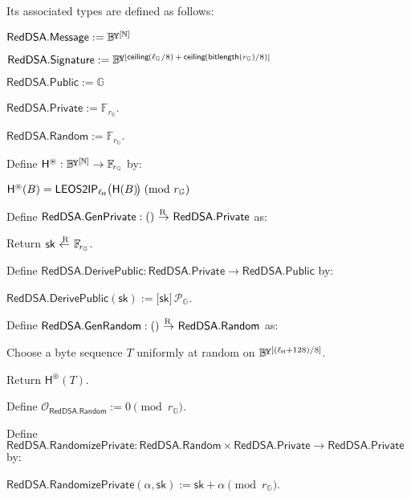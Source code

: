 \documentclass{article}
\newcommand{\typecolon}{:}
\newcommand{\overlap}[2]{\rlap{#2}\hspace{#1}{#2}}
\newcommand{\byte}{\mathbb{B}\kern -0.1em\raisebox{0.48ex}{\overlap{0.0001em}{\scalebox{0.7}{$\mathbb{Y}$}}}}
\newcommand{\Nat}{\mathbb{N}}
\newcommand{\Field}[1]{\mathbb{F}_{\!#1}}
\newcommand{\typeexp}[2]{{#1}\vphantom{)}^{[{#2}]}}
\newcommand{\byteseq}[1]{\typeexp{\byte}{#1}}
\newcommand{\byteseqs}{\byteseq{\Nat}}
\newcommand{\bitlength}{\mathsf{bitlength}}
\newcommand{\ceiling}[1]{\mathsf{ceiling}\kern-0.06em\left({#1}\right)}
\newcommand{\scalarmult}[2]{\boldsymbol{[}{#1}\boldsymbol{]}\,{#2}}
\newcommand{\clasp}[3][0pt]{\stackengine{0pt}{#3}{\kern#1#2}{O}{c}{F}{F}{L}}
\newcommand{\rightarrowR}{\mathop{\clasp[-0.18em]{\raisebox{1.15ex}{\scriptsize R}}{$\,\rightarrow\,$}}}
\newcommand{\leftarrowR}{\mathop{\clasp[0.15em]{\raisebox{1.15ex}{\scriptsize R}}{$\,\leftarrow\,$}}}
\newcommand{\sk}{\mathsf{sk}}
\newcommand{\RedDSA}{\mathsf{RedDSA}}
\newcommand{\RedDSAPublic}{\RedDSA\mathsf{.Public}}
\newcommand{\RedDSAPrivate}{\RedDSA\mathsf{.Private}}
\newcommand{\RedDSAMessage}{\RedDSA\mathsf{.Message}}
\newcommand{\RedDSASignature}{\RedDSA\mathsf{.Signature}}
\newcommand{\RedDSAGenPrivate}{\RedDSA\mathsf{.GenPrivate}}
\newcommand{\RedDSADerivePublic}{\RedDSA\mathsf{.DerivePublic}}
\newcommand{\RedDSARandom}{\RedDSA\mathsf{.Random}}
\newcommand{\RedDSAGenRandom}{\RedDSA\mathsf{.GenRandom}}
\newcommand{\RedDSARandomizePrivate}{\RedDSA\mathsf{.RandomizePrivate}}
\newcommand{\RedDSARandomizerId}{\Zero_{\RedDSARandom}}
\newcommand{\RedDSARandomizer}{\alpha}
\newcommand{\RedDSAHash}{\mathsf{H}}
\newcommand{\RedDSAHashToScalar}{\RedDSAHash^{\circledast}}
\newcommand{\RedDSAHashLength}{\ell_{\RedDSAHash}}
\newcommand{\Zero}{\mathcal{O}}
\newcommand{\Generator}{\mathcal{P}}
\newcommand{\ParamG}[1]{{{#1}_\mathbb{G}}}
\newcommand{\GroupG}[1]{\mathbb{G}_{#1}}
\newcommand{\GenG}[1]{\Generator_{\GroupG{#1}}}
\newcommand{\ellG}[1]{\ell_{\GroupG{#1}}}
\newcommand{\LEOStoIP}[1]{\mathsf{LEOS2IP}_{#1}}
\begin{document}
Its associated types are defined as follows:
\begin{formulae}
  \item $\RedDSAMessage := \byteseqs$
  \item $\RedDSASignature := \smash{\byteseq{\ceiling{\smash{\ellG{}}/8}\, +\, \ceiling{\bitlength(\ParamG{r})/8}}}$
  \item $\RedDSAPublic := \GroupG{}$
  \item $\RedDSAPrivate := \Field{\ParamG{r}}$.
  \item $\RedDSARandom := \Field{\ParamG{r}}$.
\end{formulae}

Define $\RedDSAHashToScalar \typecolon \byteseqs \rightarrow \Field{\ParamG{r}}$ by:
\begin{formulae}
  \item $\RedDSAHashToScalar(B) = \LEOStoIP{\RedDSAHashLength}\big(\RedDSAHash(B)\kern-0.16em\big) \!\pmod{\ParamG{r}}$
\end{formulae}

Define $\RedDSAGenPrivate \typecolon () \rightarrowR \RedDSAPrivate$ as:
\begin{formulae}
  \item Return $\sk \leftarrowR \Field{\ParamG{r}}$.
\end{formulae}

Define $\RedDSADerivePublic \typecolon \RedDSAPrivate \rightarrow \RedDSAPublic$ by:
\begin{formulae}
  \item $\RedDSADerivePublic(\sk) := \scalarmult{\sk}{\GenG{}}$.
\end{formulae}

Define $\RedDSAGenRandom \typecolon () \rightarrowR \RedDSARandom$ as:
\begin{formulae}
  \item Choose a byte sequence $T$ uniformly at random on $\byteseq{(\RedDSAHashLength+128)/8}$.
  \item Return $\RedDSAHashToScalar(T)$.
\end{formulae}

Define $\RedDSARandomizerId := 0 \pmod{\ParamG{r}}$.

Define $\RedDSARandomizePrivate \typecolon \RedDSARandom \times \RedDSAPrivate \rightarrow \RedDSAPrivate$ by:
\begin{formulae}
  \item $\RedDSARandomizePrivate(\RedDSARandomizer, \sk) := \sk + \RedDSARandomizer \pmod{\ParamG{r}}$.
\end{formulae}
\end{document}
